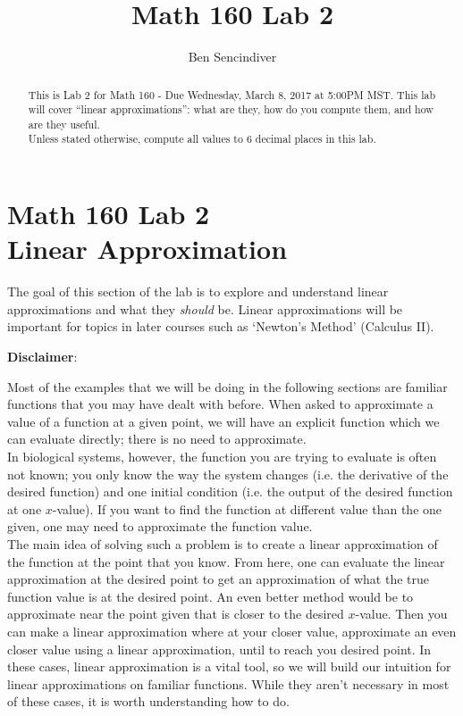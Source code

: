 \documentclass[handout,nooutcomes]{ximera}
\title{Math 160 Lab 2}
\author{Ben Sencindiver} %
\begin{document}
\section{Math 160 Lab 2 \\ Linear Approximation}

\begin{abstract}
This is Lab 2 for Math 160 - Due Wednesday, March 8, 2017 at 5:00PM MST.
This lab will cover ``linear approximations'': what are they,
how do you compute them, and how are they useful. \\

Unless stated otherwise, compute all values to $6$ decimal places in this lab.
\end{abstract}



\maketitle



The goal of this section of the lab is to explore and understand linear
approximations and what they {\it should} be. Linear approximations will
be important for topics in later courses such as `Newton's Method' (Calculus II).

\textbf{Disclaimer}:

Most of the examples that we will be doing in the following sections
are familiar functions that you may have dealt with before. 
When asked to approximate a value of a function at a given point, 
we will have an explicit function which we can evaluate directly; there
is no need to approximate. \\

In biological systems, however, the function you are trying to evaluate
is often not known; you only know the way the system changes 
(i.e. the derivative of the desired function) and one initial condition
(i.e. the output of the desired function at one $x$-value). If you want
to find the function at different value than the one given,
one may need to approximate the function value.\\

The main idea of solving such a problem is to create a 
linear approximation of the function at the point that you know. From here,
one can evaluate the linear approximation at the desired point to get an
approximation of what the true function value is at the desired point. 
An even better method would be to approximate near the point given that
is closer to the desired $x$-value. Then you can make a linear approximation
where at your closer value, approximate an even closer value using a linear
approximation, until to reach you desired point. In these cases, linear
approximation is a vital tool, so we will build our intuition for linear
approximations on familiar functions. While they aren't necessary in most
of these cases, it is worth understanding how to do.
\end{document}
